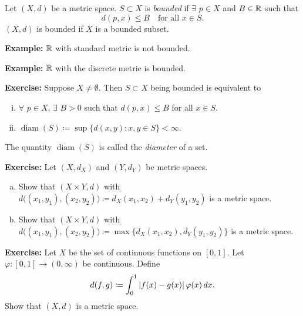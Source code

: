 \documentclass[10pt,aspectratio=169]{beamer}
\begin{document}
\begin{frame}

\begin{definition}
Let $(X,d)$ be a metric space.  $S \subset X$ is 
\emph{bounded} if $\exists$ $p \in X$ and
$B \in {\mathbb{R}}$ such that
\begin{equation*}
d(p,x) \leq B \quad \text{for all } x \in S.
\end{equation*}
\pause
$(X,d)$ is bounded if $X$ is a bounded subset.
\end{definition}

\pause
\textbf{Example:}
${\mathbb{R}}$ with standard metric is not bounded.

\pause
\medskip

\textbf{Example:}
${\mathbb{R}}$ with the discrete metric is bounded.

\pause
\medskip

\textbf{Exercise:}
Suppose $X \not= \emptyset$.
Then $S \subset X$ being bounded is equivalent to
\begin{enumerate}[(i)]
\item
\pause
$\forall$ $p \in X$, $\exists$ $B > 0$ such that $d(p,x) \leq B$ for
all $x \in S$.
\item
\pause
$\operatorname{diam}(S) \coloneqq \sup \bigl\{ d(x,y) : x,y \in S \bigr\} < \infty$.
\end{enumerate}

\pause
The quantity $\operatorname{diam}(S)$ is called the
\emph{diameter} of a set.

\end{frame}

\begin{frame}

\textbf{Exercise:}
Let $(X,d_X)$ and $(Y,d_Y)$ be metric spaces.
\begin{enumerate}[a)]
\item
Show that $(X \times Y,d)$ with
$d\bigl( (x_1,y_1), (x_2,y_2) \bigr) \coloneqq d_X(x_1,x_2) + d_Y(y_1,y_2)$ is
a metric space.
\item
Show that $(X \times Y,d)$ with
$d\bigl( (x_1,y_1), (x_2,y_2) \bigr) \coloneqq \max \bigl\{ d_X(x_1,x_2) ,
d_Y(y_1,y_2) \bigr\}$ is
a metric space.
\end{enumerate}

\medskip
\pause

\textbf{Exercise:}
Let $X$ be the set of continuous functions on $[0,1]$.  Let $\varphi \colon
[0,1] \to (0,\infty)$ be continuous.  Define
\begin{equation*}
d(f,g) \coloneqq \int_0^1 \left\lvert {f(x)-g(x)} \right\rvert\varphi(x)\,dx .
\end{equation*}
Show that $(X,d)$ is a metric space.

\end{frame}
\end{document}
